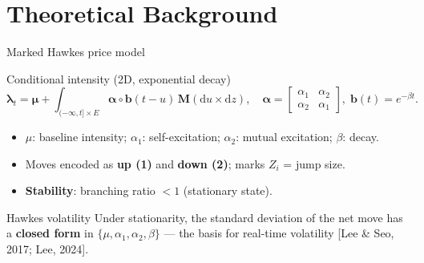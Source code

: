 \documentclass[aspectratio=169]{beamer}
\newcommand{\cit}[1]{{\footnotesize\color{mcmPrimary}[#1]}}
\begin{document}
\section{Theoretical Background}
\begin{frame}{Marked Hawkes price model}
  \begin{block}{Conditional intensity (2D, exponential decay)}
    \[
      \boldsymbol{\lambda}_t=\boldsymbol{\mu}+\int_{(-\infty,t]\times E}\boldsymbol{\alpha}\circ \boldsymbol{b}(t-u)\,\boldsymbol{M}(\mathrm{d}u\times\mathrm{d}z),
      \quad
      \boldsymbol{\alpha}=\begin{bmatrix}\alpha_1&\alpha_2\\ \alpha_2&\alpha_1\end{bmatrix},\;
      \boldsymbol{b}(t)=e^{-\beta t}.
    \]
    \begin{itemize}\footnotesize
      \item $\mu$: baseline intensity; $\alpha_1$: self-excitation; $\alpha_2$: mutual excitation; $\beta$: decay.
      \item Moves encoded as \textbf{up (1)} and \textbf{down (2)}; marks $Z_i$ = jump size.
      \item \textbf{Stability}: branching ratio $<1$ (stationary state).
    \end{itemize}
  \end{block}
  \begin{alertblock}{Hawkes volatility}
    \footnotesize Under stationarity, the standard deviation of the net move has a \textbf{closed form} in $\{\mu,\alpha_1,\alpha_2,\beta\}$ — the basis for real-time volatility \cit{Lee \& Seo, 2017; Lee, 2024}.
  \end{alertblock}
\end{frame}
\end{document}
